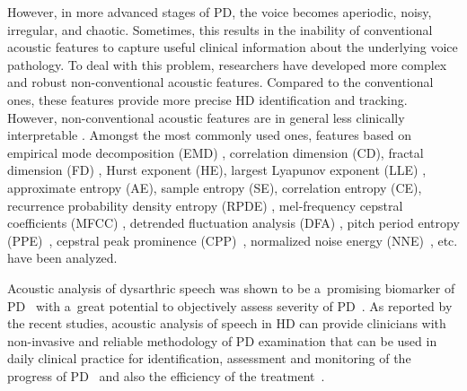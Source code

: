 However, in more advanced stages of PD, the voice becomes aperiodic, noisy, irregular, and chaotic. Sometimes, this results in the inability of conventional acoustic features to capture useful clinical information about the underlying voice pathology. To deal with this problem, researchers have developed more complex and robust non-conventional acoustic features. Compared to the conventional ones, these features provide more precise HD identification and tracking. However, non-conventional acoustic features are in general less clinically interpretable \cite{Smekal2015b}. Amongst the most commonly used ones, features based on empirical mode decomposition (EMD) \cite{Smekal2015a, Smekal2015c, Tsanas2010, Tsanas2010b}, correlation dimension (CD), fractal dimension (FD) \cite{Shao2010, Vaziri2010, Orozco2013a, Orozco2013b}, Hurst exponent (HE), largest Lyapunov exponent (LLE) \cite{Vaziri2010, Orozco2013a}, approximate entropy (AE), sample entropy (SE), correlation entropy (CE), recurrence probability density entropy (RPDE) \cite{Henriquez2009, Little2007, Little2009, Orozco2013a}, mel-frequency cepstral coefficients (MFCC) \cite{Tsanas2010, Tsanas2010b, Smekal2015b, Naranjo2016}, detrended fluctuation analysis (DFA) \cite{Little2007, Little2009, Tsanas2010, Tsanas2010b}, pitch period entropy (PPE)~\cite{Little2009}, cepstral peak prominence (CPP)~\cite{Hillenbrand1995}, normalized noise energy (NNE)~\cite{Kasuya1986}, etc. have been analyzed.

Acoustic analysis of dysarthric speech was shown to be a~promising biomarker of PD~\cite{Tsanas2012, Mekyska2015} with a~great potential to objectively assess severity of PD~\cite{Skodda2009, Tsanas2010b, Smekal2015c}. As reported by the recent studies, acoustic analysis of speech in HD can provide clinicians with non-invasive and reliable methodology of PD examination that can be used in daily clinical practice for identification, assessment and monitoring of the progress of PD~\cite{Brabenec2017, Tsanas2010b} and also the efficiency of the treatment~\cite{Harel2004b, Rusz2013b}.